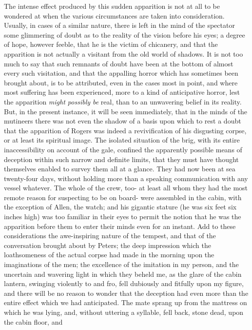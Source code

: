 The intense effect produced by this sudden apparition is not at all to be
wondered at when the various circumstances are taken into consideration.
Usually, in cases of a similar nature, there is left in the mind of the
spectator some glimmering of doubt as to the reality of the vision before his
eyes; a degree of hope, however feeble, that he is the victim of chicanery, and
that the apparition is not actually a visitant from the old world of shadows. It
is not too much to say that such remnants of doubt have been at the bottom of
almost every such visitation, and that the appalling horror which has sometimes
been brought about, is to be attributed, even in the cases most in point, and
where most suffering has been experienced, more to a kind of anticipative
horror, lest the apparition \emph{might possibly be} real, than to an unwavering
belief in its reality. But, in the present instance, it will be seen
immediately, that in the minds of the mutineers there was not even the shadow of
a basis upon which to rest a doubt that the apparition of Rogers was indeed a
revivification of his disgusting corpse, or at least its spiritual image. The
isolated situation of the brig, with its entire inaccessibility on account of
the gale, confined the apparently possible means of deception within such narrow
and definite limits, that they must have thought themselves enabled to survey
them all at a glance. They had now been at sea twenty-four days, without holding
more than a speaking communication with any vessel whatever. The whole of the
crew, too- at least all whom they had the most remote reason for suspecting to
be on board- were assembled in the cabin, with the exception of Allen, the
watch; and his gigantic stature (he was six feet six inches high) was too
familiar in their eyes to permit the notion that he was the apparition before
them to enter their minds even for an instant. Add to these considerations the
awe-inspiring nature of the tempest, and that of the conversation brought about
by Peters; the deep impression which the loathsomeness of the actual corpse had
made in the morning upon the imaginations of the men; the excellence of the
imitation in my person, and the uncertain and wavering light in which they
beheld me, as the glare of the cabin lantern, swinging violently to and fro,
fell dubiously and fitfully upon my figure, and there will be no reason to
wonder that the deception had even more than the entire effect which we had
anticipated. The mate sprang up from the mattress on which he was lying, and,
without uttering a syllable, fell back, stone dead, upon the cabin floor, and
